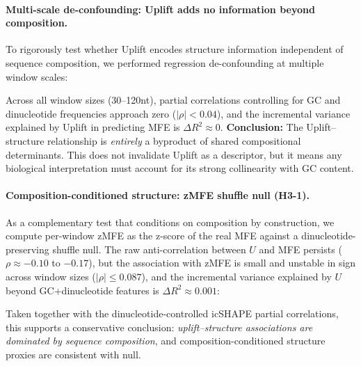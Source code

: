 \paragraph{Multi-scale de-confounding: Uplift adds no information beyond composition.}
To rigorously test whether Uplift encodes structure information independent of sequence composition, we performed regression de-confounding at multiple window scales:

Across all window sizes (30--120nt), partial correlations controlling for GC and dinucleotide frequencies approach zero ($|\rho|<0.04$), and the incremental variance explained by Uplift in predicting MFE is $\Delta R^2 \approx 0$.
\textbf{Conclusion:} The Uplift--structure relationship is \emph{entirely} a byproduct of shared compositional determinants.
This does not invalidate Uplift as a descriptor, but it means any biological interpretation must account for its strong collinearity with GC content.

\paragraph{Composition-conditioned structure: zMFE shuffle null (H3-1).}
As a complementary test that conditions on composition by construction, we compute per-window zMFE as the z-score of the real MFE against a dinucleotide-preserving shuffle null.
The raw anti-correlation between $U$ and MFE persists ($\rho\approx -0.10$ to $-0.17$), but the association with zMFE is small and unstable in sign across window sizes ($|\rho|\le 0.087$), and the incremental variance explained by $U$ beyond GC+dinucleotide features is $\Delta R^2\approx 0.001$:

Taken together with the dinucleotide-controlled icSHAPE partial correlations, this supports a conservative conclusion: \emph{uplift--structure associations are dominated by sequence composition}, and composition-conditioned structure proxies are consistent with null.

